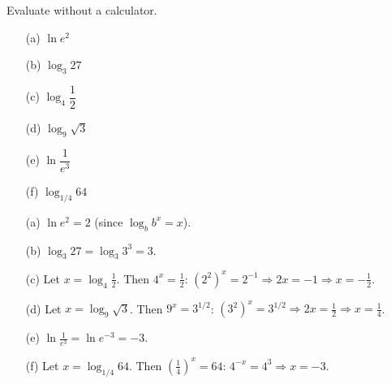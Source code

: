 \documentclass{ximera}
\begin{document}
\begin{problem}
Evaluate without a calculator.
\begin{enumerate}
  \item[(a)] $\ln e^2$
  \item[(b)] $\log_3 27$
  \item[(c)] $\log_4 \dfrac{1}{2}$
  \item[(d)] $\log_9 \sqrt{3}$
  \item[(e)] $\ln \dfrac{1}{e^3}$
  \item[(f)] $\log_{1/4} 64$
\end{enumerate}

\begin{solution}
\begin{enumerate}
  \item[(a)] $\ln e^2 = 2$ (since $\log_b b^x = x$).
  \item[(b)] $\log_3 27 = \log_3 3^3 = 3$.
  \item[(c)] Let $x=\log_4\tfrac{1}{2}$. Then $4^x=\tfrac{1}{2}$: $(2^2)^x=2^{-1}\Rightarrow 2x=-1\Rightarrow x=-\tfrac{1}{2}$.
  \item[(d)] Let $x=\log_9\sqrt{3}$. Then $9^x=3^{1/2}$: $(3^2)^x=3^{1/2}\Rightarrow 2x=\tfrac{1}{2}\Rightarrow x=\tfrac{1}{4}$.
  \item[(e)] $\ln\tfrac{1}{e^3}=\ln e^{-3}=-3$.
  \item[(f)] Let $x=\log_{1/4}64$. Then $\left(\tfrac{1}{4}\right)^x=64$: $4^{-x}=4^3\Rightarrow x=-3$.
\end{enumerate}
\end{solution}
\end{problem}
\end{document}
